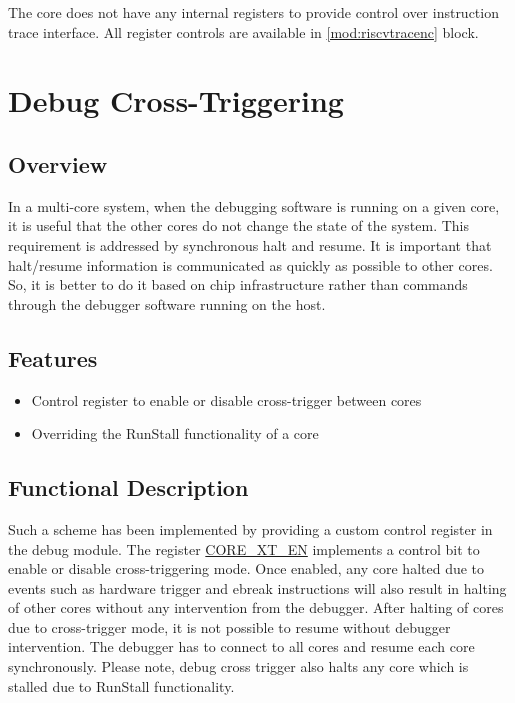 \documentclass[main\_\_EN.tex]{subfiles}
\begin{document}
The core does not have any internal registers to provide control over instruction trace interface. All register controls are available in \ref{mod:riscvtracenc} \textit{} block.


\clearpage
\section{Debug Cross-Triggering}
\label{sec:riscvcpu-cti}

\subsection{Overview}
\label{sec:riscvcpu-cti-overview}
In a multi-core system, when the debugging software is running on a given core, it is useful that the other cores do not change the state of the system. This requirement is addressed by synchronous halt and resume. It is important that halt/resume information is communicated as quickly as possible to other cores. So, it is better to do it based on chip infrastructure rather than commands through the debugger software running on the host.

\subsection{Features}
\label{sec:riscvcpu-cti-features}
 \begin{itemize}
    \item Control register to enable or disable cross-trigger between cores
    \item Overriding the RunStall functionality of a core
\end{itemize}

\subsection{Functional Description}
\label{sec:riscvcpu-cti-func-descr}

Such a scheme has been implemented by providing a custom control register in the debug module. The register \hyperref[regdesc:CTI_EN]{CORE\_XT\_EN} implements a control bit to enable or disable cross-triggering mode. Once enabled, any core halted due to events such as hardware trigger and ebreak instructions will also result in halting of other cores without any intervention from the debugger. After halting of cores due to cross-trigger mode, it is not possible to resume without debugger intervention. The debugger has to connect to all cores and resume each core synchronously. Please note, debug cross trigger also halts any core which is stalled due to RunStall functionality.
\end{document}
